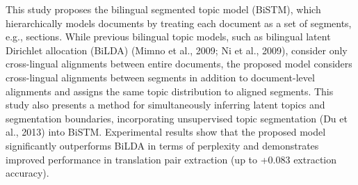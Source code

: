 This study proposes the bilingual segmented topic model (BiSTM), which hierarchically models documents by treating each document as a set of segments, e.g., sections. While previous bilingual topic models, such as bilingual latent Dirichlet allocation (BiLDA) (Mimno et al., 2009; Ni et al., 2009), consider only cross-lingual alignments between entire documents, the proposed model considers cross-lingual alignments between segments in addition to document-level alignments and assigns the same topic distribution to aligned segments. This study also presents a method for simultaneously inferring latent topics and segmentation boundaries, incorporating unsupervised topic segmentation (Du et al., 2013) into BiSTM. Experimental results show that the proposed model significantly outperforms BiLDA in terms of perplexity and demonstrates improved performance in translation pair extraction (up to +0.083 extraction accuracy).
